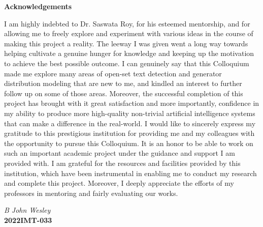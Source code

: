 \begin{center}
{\LARGE \bf Acknowledgements}
\end{center}
\noindent I am highly indebted to Dr. Saswata Roy, for his esteemed mentorship, and for allowing me to freely explore and experiment with various ideas in the course of making this project a reality. The leeway I was given went a long way towards helping cultivate a genuine hunger for knowledge and keeping up the motivation to achieve the best possible outcome. I can genuinely say that this Colloquium made me explore many areas of open-set text detection and generator distribution modeling that are new to me, and kindled an interest to further follow up on some of those areas. Moreover, the successful completion of this project has brought with it great satisfaction and more importantly, confidence in my ability to produce more high-quality non-trivial artificial intelligence systems that can make a difference in the real-world. I would like to sincerely express my gratitude to this prestigious institution for providing me and my colleagues with the opportunity to pursue this Colloquium. It is an honor to be able to work on such an important academic project under the guidance and support I am provided with. I am grateful for the resources and facilities provided by this institution, which have been instrumental in enabling me to conduct my research and complete this project. Moreover, I deeply appreciate the efforts of my professors in mentoring and fairly evaluating our works.

\begin{flushright}
\vspace{0.8cm}
{\itshape B John Wesley} \\
{\bfseries 2022IMT-033}
\end{flushright}

